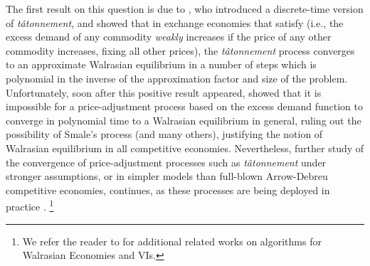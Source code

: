 The first result on this question is due to \citet{codenotti2005market}, who introduced a discrete-time version of \emph{t\^atonnement}, and showed that in exchange economies that satisfy  (i.e., the excess demand of any commodity \emph{weakly} increases if the price of any other commodity increases, fixing all other prices), the \emph{t\^atonnement\/} process converges to an approximate Walrasian equilibrium in a number of steps which is polynomial in the inverse of the approximation factor and size of the problem.
Unfortunately, soon after this positive result appeared, \citet{papadimitriou2010impossibility} showed that it is impossible for a price-adjustment process based on the excess demand function to converge in polynomial time to a Walrasian equilibrium in general, ruling out the possibility of Smale's process (and many others), justifying the notion of Walrasian equilibrium in all competitive economies.
Nevertheless, further study of the convergence of price-adjustment processes such as \emph{t\^atonnement\/} under stronger assumptions, or in simpler models than full-blown Arrow-Debreu competitive economies, continues, as these processes are being deployed in practice \cite{jain2013constrained, leonardos2021dynamical, liu2022empirical, reijsbergen2021transaction}.%
\footnote{We refer the reader to  for additional related works on algorithms for Walrasian Economies and VIs.}
